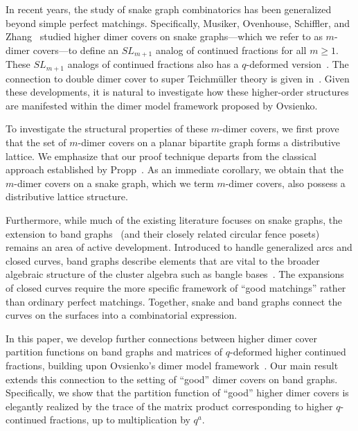 \documentclass[11pt]{amsart}
\theoremstyle{definition}
\theoremstyle{remark}
\numberwithin{equation}{section}
\begin{document}
In recent years, the study of snake graph combinatorics has been generalized beyond simple perfect matchings. Specifically, Musiker, Ovenhouse, Schiffler, and Zhang~\cite{Musiker2023HigherDC} studied higher dimer covers on snake graphs---which we refer to as $m$-dimer covers---to define an $SL_{m+1}$ analog of continued fractions for all $m\geq 1$. These $SL_{m+1}$ analogs of continued fractions also has a $q$-deformed version~\cite{BOSZ26}. The connection to double dimer cover to super Teichm\"uller theory is given in~\cite{musiker2022double}. Given these developments, it is natural to investigate how these higher-order structures are manifested within the dimer model framework proposed by Ovsienko. 


To investigate the structural properties of these $m$-dimer covers, we first prove that the set of $m$-dimer covers on a planar bipartite graph forms a distributive lattice. We emphasize that our proof technique departs from the classical approach established by Propp~\cite{proppDimerThy}. As an immediate corollary, we obtain that the $m$-dimer covers on a snake graph, which we term $m$-dimer covers, also possess a distributive lattice structure.

Furthermore, while much of the existing literature focuses on snake graphs, the extension to band graphs~\cite{Apruzzese25,musiker2011positivity,musiker2013bases} (and their closely related circular fence posets) remains an area of active development. Introduced to handle generalized arcs and closed curves, band graphs describe elements that are vital to the broader algebraic structure of the cluster algebra such as bangle bases~\cite{musiker2013bases}. The expansions of closed curves require the more specific framework of ``good matchings'' rather than ordinary perfect matchings. Together, snake and band graphs connect the curves on the surfaces into a combinatorial expression.

In this paper, we develop further connections between higher dimer cover partition functions on band graphs and matrices of $q$-deformed higher continued fractions, building upon Ovsienko's dimer model framework~\cite{ovsienko2025qrationalsdimers}. Our main result extends this connection to the setting of ``good'' dimer covers on band graphs. Specifically, we show that the partition function of ``good'' higher dimer covers is elegantly realized by the trace of the matrix product corresponding to higher $q$-continued fractions, up to multiplication by $q^a$. 
\end{document}
